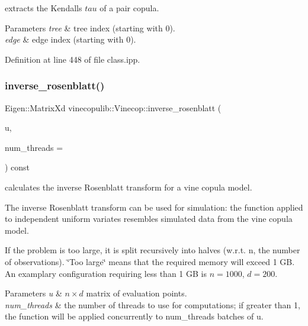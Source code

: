 extracts the Kendall\textquotesingle{}s $ tau $ of a pair copula. 


\begin{DoxyParams}{Parameters}
{\em tree} & tree index (starting with 0). \\
\hline
{\em edge} & edge index (starting with 0). \\
\hline
\end{DoxyParams}


Definition at line 448 of file class.\+ipp.

\mbox{\label{classvinecopulib_1_1_vinecop_a73da79be3f0f3cb892afbd8f41dcad6b}} 
\subsubsection{\texorpdfstring{inverse\+\_\+rosenblatt()}{inverse\_rosenblatt()}}
{\footnotesize\ttfamily Eigen\+::\+Matrix\+Xd vinecopulib\+::\+Vinecop\+::inverse\+\_\+rosenblatt (\begin{DoxyParamCaption}\item[{const Eigen\+::\+Matrix\+Xd \&}]{u,  }\item[{const size\+\_\+t}]{num\+\_\+threads = {} }\end{DoxyParamCaption}) const\hspace{0.3cm}{\ttfamily [inline]}}



calculates the inverse Rosenblatt transform for a vine copula model. 

The inverse Rosenblatt transform can be used for simulation\+: the function applied to independent uniform variates resembles simulated data from the vine copula model.

If the problem is too large, it is split recursively into halves (w.\+r.\+t. n, the number of observations). \char`\"{}\+Too large\char`\"{} means that the required memory will exceed 1 GB. An examplary configuration requiring less than 1 GB is $ n = 1000 $, $d = 200$.


\begin{DoxyParams}{Parameters}
{\em u} & $ n \times d $ matrix of evaluation points. \\
\hline
{\em num\+\_\+threads} & the number of threads to use for computations; if greater than 1, the function will be applied concurrently to {\ttfamily num\+\_\+threads} batches of {\ttfamily u}. \\
\hline
\end{DoxyParams}



